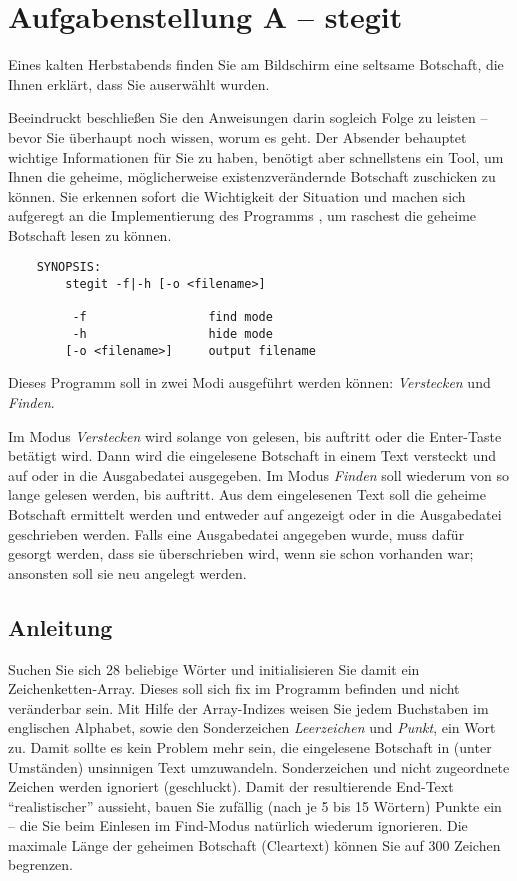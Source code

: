 




\section*{Aufgabenstellung A -- stegit}

Eines kalten Herbstabends finden Sie am Bildschirm eine seltsame Botschaft, die
Ihnen erklärt, dass Sie auserwählt wurden.

Beeindruckt beschließen Sie den Anweisungen darin sogleich Folge zu leisten --
bevor Sie überhaupt noch wissen, worum es geht. Der Absender behauptet wichtige
Informationen für Sie zu haben, benötigt aber schnellstens ein Tool, um Ihnen
die geheime, möglicherweise existenzverändernde Botschaft zuschicken zu können.
Sie erkennen sofort die Wichtigkeit der Situation und machen sich aufgeregt an
die Implementierung des Programms , um raschest die geheime
Botschaft lesen zu können.

\begin{verbatim}
    SYNOPSIS:
        stegit -f|-h [-o <filename>]

         -f                 find mode
         -h                 hide mode
        [-o <filename>]     output filename
\end{verbatim}

Dieses Programm soll in zwei Modi ausgeführt werden können: \emph{Verstecken}
und \emph{Finden}.

Im Modus \emph{Verstecken} wird solange von  gelesen, bis
 auftritt oder die Enter-Taste betätigt wird. Dann wird die
eingelesene Botschaft in einem Text versteckt und auf 
oder in die Ausgabedatei ausgegeben. Im Modus \emph{Finden} soll wiederum von
 so lange gelesen werden, bis  auftritt.
Aus dem eingelesenen Text soll die geheime Botschaft ermittelt werden und
entweder auf  angezeigt oder in die Ausgabedatei
geschrieben werden. Falls eine Ausgabedatei angegeben wurde, muss dafür gesorgt
werden, dass sie überschrieben wird, wenn sie schon vorhanden war; ansonsten
soll sie neu angelegt werden.

\subsection*{Anleitung}
Suchen Sie sich 28 beliebige Wörter und initialisieren Sie damit ein
Zeichenketten-Array. Dieses soll sich fix im Programm befinden und nicht
veränderbar sein. Mit Hilfe der Array-Indizes weisen Sie jedem Buchstaben im
englischen Alphabet, sowie den Sonderzeichen \emph{Leerzeichen} und
\emph{Punkt}, ein Wort zu. Damit sollte es kein Problem mehr sein, die
eingelesene Botschaft in (unter Umständen) unsinnigen Text umzuwandeln.
Sonderzeichen und nicht zugeordnete Zeichen werden ignoriert (geschluckt). Damit
der resultierende End-Text "`realistischer"' aussieht, bauen Sie zufällig (nach
je 5 bis 15 Wörtern) Punkte ein -- die Sie beim Einlesen im Find-Modus natürlich
wiederum ignorieren.  Die maximale Länge der geheimen Botschaft (Cleartext)
können Sie auf 300 Zeichen begrenzen.


